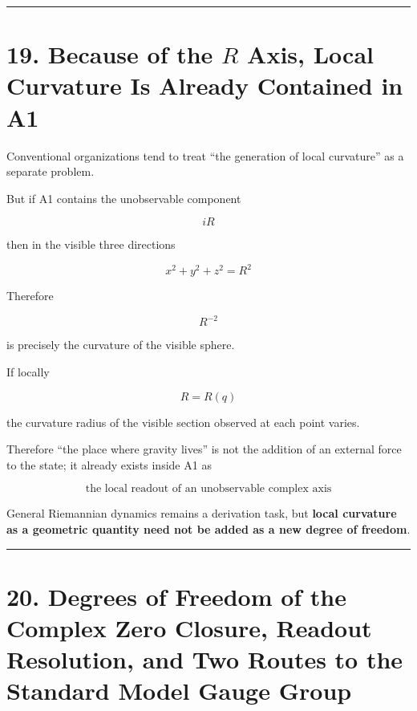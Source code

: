 \documentclass[
  a4paper,
]{article}
\begin{document}
\begin{center}\rule{0.5\linewidth}{0.5pt}\end{center}

\section{\texorpdfstring{19. Because of the \(R\) Axis, Local Curvature
Is Already Contained in
A1}{19. Because of the R Axis, Local Curvature Is Already Contained in A1}}\label{because-of-the-r-axis-local-curvature-is-already-contained-in-a1}

Conventional organizations tend to treat ``the generation of local
curvature'' as a separate problem.

But if A1 contains the unobservable component

\[
iR
\]

then in the visible three directions

\[
x^2+y^2+z^2=R^2
\]

Therefore

\[
\boxed{
R^{-2}
}
\]

is precisely the curvature of the visible sphere.

If locally

\[
R=R(q)
\]

the curvature radius of the visible section observed at each point
varies.

Therefore ``the place where gravity lives'' is not the addition of an
external force to the state; it already exists inside A1 as

\[
\boxed{
\text{the local readout of an unobservable complex axis}
}
\]

General Riemannian dynamics remains a derivation task, but \textbf{local
curvature as a geometric quantity need not be added as a new degree of
freedom}.

\begin{center}\rule{0.5\linewidth}{0.5pt}\end{center}

\section{20. Degrees of Freedom of the Complex Zero Closure, Readout
Resolution, and Two Routes to the Standard Model Gauge
Group}\label{degrees-of-freedom-of-the-complex-zero-closure-readout-resolution-and-two-routes-to-the-standard-model-gauge-group}
\end{document}
